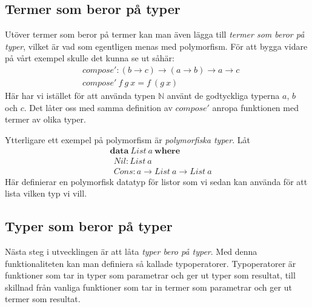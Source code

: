 \subsection{Termer som beror på typer}
Utöver termer som beror på termer kan man även lägga till \emph{termer som
beror på typer}, vilket är vad som egentligen menas med polymorfism. För att
bygga vidare på vårt exempel skulle det kunna se ut såhär:
\begin{align*}
  &compose' : (b \to c) \to (a \to b) \to a \to c \\
  &compose'\ f\ g\ x = f\ (g\ x)
\end{align*}
Här har vi istället för att använda typen $\mathbb{N}$ använt de godtyckliga
typerna $a$, $b$ och $c$. Det låter oss med samma definition av $compose'$
anropa funktionen med termer av olika typer.

Ytterligare ett exempel på polymorfism är \emph{polymorfiska typer}. Låt
\begin{align*}
  &\boldsymbol{data}\ List\ a\ \boldsymbol{where} \\
  &\ \ Nil : List\ a \\
  &\ \ Cons : a \to List\ a \to List\ a
\end{align*}
Här definierar en polymorfisk datatyp för listor som vi sedan kan använda för
att lista vilken typ vi vill.

\subsection{Typer som beror på typer}
Nästa steg i utvecklingen är att låta \emph{typer bero på typer}. Med denna
funktionaliteten kan man definiera så kallade typoperatorer. Typoperatorer är
funktioner som tar in typer som parametrar och ger ut typer som resultat, till
skillnad från vanliga funktioner som tar in termer som parametrar och ger ut
termer som resultat.

